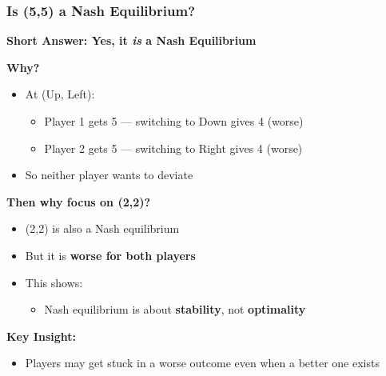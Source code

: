 \begin{frame}[fragile]\frametitle{Is (5,5) a Nash Equilibrium?}

\textbf{Short Answer: Yes, it \textit{is} a Nash Equilibrium}

\vspace{6pt}

\textbf{Why?}
\begin{itemize}
  \item At (Up, Left):
  \begin{itemize}
    \item Player 1 gets 5 — switching to Down gives 4 (worse)
    \item Player 2 gets 5 — switching to Right gives 4 (worse)
  \end{itemize}
  \item So neither player wants to deviate
\end{itemize}

\vspace{8pt}

\textbf{Then why focus on (2,2)?}
\begin{itemize}
  \item (2,2) is also a Nash equilibrium
  \item But it is \textbf{worse for both players}
  \item This shows:
  \begin{itemize}
    \item Nash equilibrium is about \textbf{stability}, not \textbf{optimality}
  \end{itemize}
\end{itemize}

\vspace{6pt}

\textbf{Key Insight:}
\begin{itemize}
  \item Players may get stuck in a worse outcome even when a better one exists
\end{itemize}

\end{frame}

